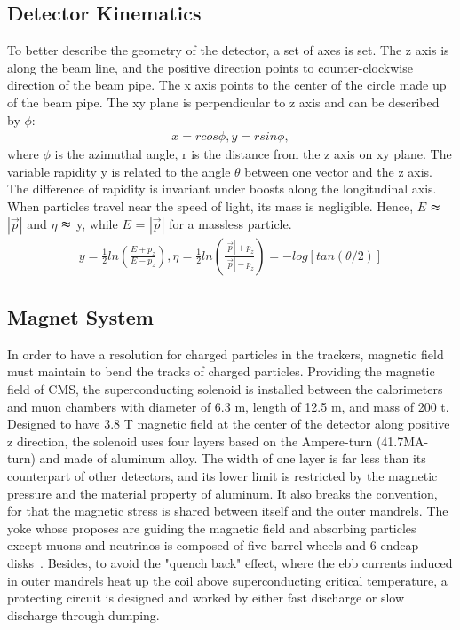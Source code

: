 \subsection{Detector Kinematics} 
To better describe the geometry of the detector, a set of axes is set. The z axis is along the beam line, and the positive direction points to counter-clockwise direction of the beam pipe. The x axis points to the center of the circle made up of the beam pipe. The xy plane is perpendicular to z axis and can be described by $\phi $:
\begin{equation} \label{eq1}
\begin{split}
x=rcos\phi, y=rsin\phi,
\end{split}
\end{equation}
where $\phi$ is the azimuthal angle, r is the distance from the z axis on xy plane. The variable rapidity y is related to the angle $\theta$ between one vector and the z axis. The difference of rapidity is invariant under boosts along the longitudinal axis. When particles travel near the speed of light, its mass is negligible. Hence, $E$ $\thickapprox$ $|\vec{p}|$ and $\eta$ $\thickapprox$ y, while $E$ = $|\vec{p}|$ for a massless particle.
\begin{equation} \label{eq1}
\begin{split}
y = \frac{1}{2} ln( \frac{E+p_z}{E-p_z} ), \eta = \frac{1}{2} ln( \frac{|\vec{p}|+p_z}{|\vec{p}|-p_z} ) = -log[tan(\theta /2)]
\end{split}
\end{equation}

\subsection{Magnet System} 
In order to have a resolution for charged particles in the trackers, magnetic field must maintain to bend the tracks of charged particles. 
Providing the magnetic field of CMS, the superconducting solenoid is installed between the calorimeters and muon chambers with diameter of 6.3 m, length of 12.5 m, and mass of 200 t. 
Designed to have 3.8 T magnetic field at the center of the detector along positive z direction, the solenoid uses four layers based on the Ampere-turn (41.7MA-turn) and made of aluminum alloy.
The width of one layer is far less than its counterpart of other detectors, and its lower limit is restricted by the magnetic pressure and the material property of aluminum.
It also breaks the convention, for that the magnetic stress is shared between itself and the outer mandrels. 
The yoke whose proposes are guiding the magnetic field and absorbing particles except muons and neutrinos is composed of five barrel wheels and 6 endcap disks~\citep{yoke}. 
Besides, to avoid the "quench back" effect, where the ebb currents induced in outer mandrels heat up the coil above superconducting critical temperature, 
a protecting circuit is designed and worked by either fast discharge or slow discharge through dumping. 

